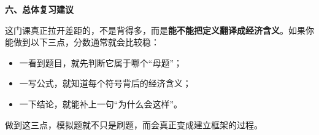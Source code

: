 \textbf{六、总体复习建议}

这门课真正拉开差距的，不是背得多，而是\textbf{能不能把定义翻译成经济含义}。如果你能做到以下三点，分数通常就会比较稳：

\begin{itemize}[leftmargin=2em,itemsep=0.25em,topsep=0.25em]
  \item 一看到题目，就先判断它属于哪个“母题”；
  \item 一写公式，就知道每个符号背后的经济含义；
  \item 一下结论，就能补上一句“为什么会这样”。
\end{itemize}

做到这三点，模拟题就不只是刷题，而会真正变成建立框架的过程。

